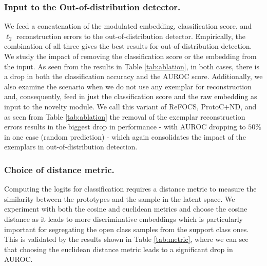 \subsubsection*{Input to the Out-of-distribution detector.} We feed a concatenation of the modulated embedding, classification score, and $\ell_2$ reconstruction errors to the out-of-distribution detector. Empirically, the combination of all three gives the best results for out-of-distribution detection. We study the impact of removing the classification score or the embedding from the input. As seen from the results in Table \ref{tab:ablation}, in both cases, there is a drop in both the classification accuracy and the AUROC score. Additionally, we also examine the scenario when we do not use any exemplar for reconstruction and, consequently, feed in just the classification score and the raw embedding as input to the novelty module. We call this variant of ReFOCS, ProtoC$+$ND, and as seen from Table \ref{tab:ablation} the removal of the exemplar reconstruction errors results in the biggest drop in performance - with AUROC dropping to $50\%$ in one case (random prediction) - which again  consolidates the impact of the exemplars in out-of-distribution detection.

\subsubsection*{Choice of distance metric.} Computing the logits for classification requires a distance metric to measure the similarity between the prototypes and the sample in the latent space. We experiment with both the cosine and euclidean metrics and choose the cosine distance as it leads to more discriminative embeddings \cite{gidaris2018dynamic,proto_rectify} which is particularly important for segregating the open class samples from the support class ones. This is validated by the results shown in Table \ref{tab:metric}, where we can see that choosing the euclidean distance metric leads to a significant drop in AUROC. 




